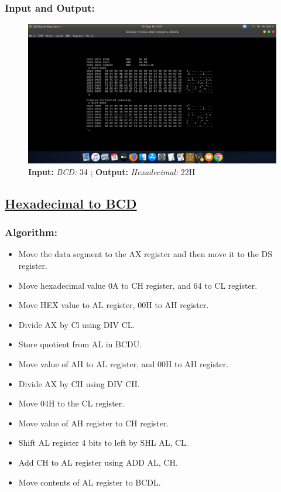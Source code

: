 \documentclass[12pt,a4paper]{article}
\begin{document}
\begin{flushleft}
\subsubsection*{\textbf{Input and Output:}}
\begin{figure}[h]
    \centering
    \includegraphics[trim = 100mm 60mm 100mm 80mm, clip, width = \textwidth]{Pics/BHIO.png}
    \caption{ \textbf{Input:} \emph{BCD:} 34 ; \newline \hspace{1cm}
              \textbf{Output:} \emph{Hexadecimal:} 22H}
\end{figure}
\newpage
\subsection*{\textbf{\underline{Hexadecimal to BCD}}}

\subsubsection*{\textbf{Algorithm:}}
\begin{itemize}
    \item Move the data segment to the AX register and then move it to the DS register.
    \item Move hexadecimal value 0A to CH register, and 64 to CL register.
    \item Move HEX value to AL register, 00H to AH register.
    \item Divide AX by Cl using DIV CL.
    \item Store quotient from AL in BCDU.
    \item Move value of AH to AL register, and 00H to AH register. 
    \item Divide AX by CH using DIV CH.
    \item Move 04H to the CL register.
    \item Move value of AH register to CH register.
    \item Shift AL register 4 bits to left by SHL AL, CL.
    \item Add CH to AL register using ADD AL, CH.
    \item Move contents of AL register to BCDL.
\end{itemize}


\end{flushleft}
\end{document}
